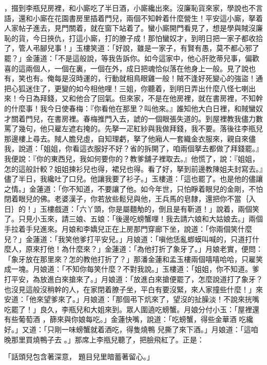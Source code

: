 ，掇到李瓶兒房裡，和小廝吃了半日酒，小廝纔出來。沒廉恥貨來家，學說也不言語，還和小廝在花園書房里插着門兒，兩個不知幹着什麼營生！平安這小廝，拏着人家帖子進去，見門關着，就在窗下站着了。蠻小廝開門看見了，想是學與賊沒廉恥的貨，今日挾仇，打這小廝，打的膫子成！那怕蠻奴才，到明日把一家子都收拾了，管人弔腳兒事！」玉樓笑道：「好說，雖是一家子，有賢有愚，莫不都心邪了罷？」金蓮道：「不是這般說，等我告訴你。如今這家中，他心肝肐蒂兒事，偏歡喜的這兩個人，一個在裏，一個在外，成日把魂恰似落在他身上一般。見了說也有，笑也有。俺每是沒時運的，行動就相鳥眼雞一般！賊不逢好死變心的強盜！通把心狐迷住了，更變的如今相他哩！三姐，你聽着，到明日弄出什麼八怪七喇出來！今日為拜錢，又和他合了回氣。但來家，不是在他房裡，就在書房裡，不知幹的什麼事！我今日使春梅：『你看他在那里？叫他來。』誰知他大白日裡，和賊蠻奴才關着門兒，在書房裡。春梅推門入去，諕的一個眼張失道的。到屋裡教我儘力數罵了幾句，他只雇左遮右掩的。先拏一疋紅紗與我做拜錢，我不要。落後往李瓶兒那邊樓上尋去。賊人膽兒虛，自知理虧，拏了他廂人一套織金衣服來，親自來儘我，說道：「姐姐，你看這衣服好不好？省的拆開了，咱兩個拏去都做了拜錢罷。』我便說：『你的東西兒，我如何要你的？教爹舖子裡取去。』他慌了，說：『姐姐，怎的這般計較？姐姐揀衫兒也得，裙兒也得。看了好，拏到前邊教陳姐夫封寫去。』儘了半日，我纔吐了口兒。他讓我要了衫子。」玉樓道：「這也罷了。也是他的儘讓之情。」金蓮道：「你不知道，不要讓了他。如今年世，只怕睜着眼兒的金剛，不怕閉着眼兒的佛。老婆漢子，你若放些鬆兒與他，王兵馬的皂隸，還把你不當｛入日｝的！」玉樓戲道：「六丫頭，你是屬麵觔的，倒且是有靳道！」說着，兩個笑了。只見小玉來，請三娘、五娘：「後邊吃螃蟹哩！我去請六娘和大姑娘去。」兩個手拉着手兒進來。月娘和李嬌兒正在上房那門穿廊下坐，說道：「你兩個笑什麼兒？」金蓮道：「我笑他爹打平安兒。」月娘道：「嗔他恁亂蝍蟆叫喊的，只道打什麼人，原來打他！為什麼來？」金蓮道：「為他打折了象牙了。」月娘老實，便問：「象牙放在那里來？怎的教他打折了？」那潘金蓮和孟玉樓兩個嘻嘻哈哈，只雇笑成一塊。月娘道：「不知你每笑什麼？不對我說。」玉樓道：「姐姐，你不知道。爹打平安，為放進白來搶來了。」月娘道：「放進白來搶便罷了，怎麼說道打了象牙？也沒見這般沒稍幹的人，在家閉着膫子坐，平白有要沒緊，來人家撞些什麼！」來安道：「他來望爹來了。」月娘道：「那個弔下炕來了，望沒的扯臊淡！不說來挄嘴吃罷了！」良久，李瓶兒和大姐來到。眾人圍遶吃螃蟹。月娘分付小玉：「屋裡還有些葡萄酒 ，篩來與你娘每吃。」金蓮快嘴，說道：「吃螃蟹，得些金華酒 吃纔好。」又道：「只剛一味螃蟹就着酒吃，得隻燒鴨 兒撕了來下酒。」月娘道：「這咱晚那里買燒鴨子去 。」那席上李瓶兒聽了，把臉飛紅了。正是：

「話頭兒包含著深意，  題目兒里暗蓄著留心。」

